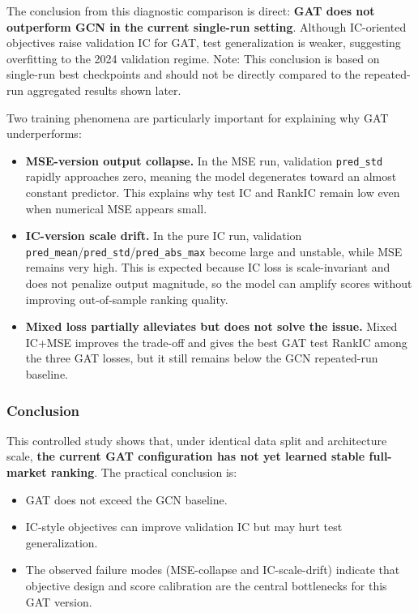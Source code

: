 The conclusion from this diagnostic comparison is direct: \textbf{GAT does not outperform GCN in the current single-run setting}. Although IC-oriented objectives raise validation IC for GAT, test generalization is weaker, suggesting overfitting to the 2024 validation regime. Note: This conclusion is based on single-run best checkpoints and should not be directly compared to the repeated-run aggregated results shown later.

Two training phenomena are particularly important for explaining why GAT underperforms:
\begin{itemize}
\item \textbf{MSE-version output collapse.} In the MSE run, validation \texttt{pred\_std} rapidly approaches zero, meaning the model degenerates toward an almost constant predictor. This explains why test IC and RankIC remain low even when numerical MSE appears small.
\item \textbf{IC-version scale drift.} In the pure IC run, validation \texttt{pred\_mean}/\texttt{pred\_std}/\texttt{pred\_abs\_max} become large and unstable, while MSE remains very high. This is expected because IC loss is scale-invariant and does not penalize output magnitude, so the model can amplify scores without improving out-of-sample ranking quality.
\item \textbf{Mixed loss partially alleviates but does not solve the issue.} Mixed IC+MSE improves the trade-off and gives the best GAT test RankIC among the three GAT losses, but it still remains below the GCN repeated-run baseline.
\end{itemize}

\subsubsection{Conclusion}

This controlled study shows that, under identical data split and architecture scale, \textbf{the current GAT configuration has not yet learned stable full-market ranking}. The practical conclusion is:
\begin{itemize}
\item GAT does not exceed the GCN baseline.
\item IC-style objectives can improve validation IC but may hurt test generalization.
\item The observed failure modes (MSE-collapse and IC-scale-drift) indicate that objective design and score calibration are the central bottlenecks for this GAT version.
\end{itemize}

